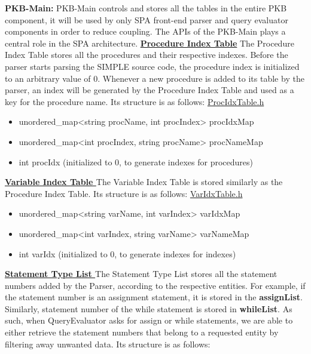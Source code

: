 \documentclass[12pt]{article}
\begin{document}
\textbf{PKB-Main:} PKB-Main controls and stores all the tables in the entire PKB component, it will be used by only SPA front-end parser and query evaluator components in order to reduce coupling. The APIs of the PKB-Main plays a central role in the SPA architecture. \textbf{\underline{Procedure Index Table}}
\newline The Procedure Index Table stores all the procedures and their respective indexes. Before the parser starts parsing the SIMPLE source code, the procedure index is initialized to an arbitrary value of 0. Whenever a new procedure is added to its table by the parser, an index will be generated by the Procedure Index Table and used as a key for the procedure name.
Its structure is as follows:\newline
\underline{ProcIdxTable.h
}
\begin{itemize}
\item unordered\_map<string procName, int procIndex> procIdxMap
\item unordered\_map<int procIndex, string procName> procNameMap
\item int procIdx (initialized to 0, to generate indexes for procedures)
\end{itemize}
\textbf{\underline{Variable Index Table
}}
\newline The Variable Index Table is stored similarly as the Procedure Index Table.
Its structure is as follows:
\newline
\underline{VarIdxTable.h}
\begin{itemize}
\item unordered\_map<string varName, int varIndex> varIdxMap
\item unordered\_map<int varIndex, string varName> varNameMap
\item int varIdx (initialized to 0, to generate indexes for indexes)
\end{itemize}
\textbf{\underline{Statement Type List
}}
\newline The Statement Type List stores all the statement numbers added by the Parser, according to the respective entities. For example, if the statement number is an assignment statement, it is stored in the \textbf{assignList}. Similarly, statement number of the while statement is stored in \textbf{whileList}.  As such, when QueryEvaluator asks for assign or while statements, we are able to either retrieve the statement numbers that belong to a requested entity by filtering away unwanted data.
\newline Its structure is as follows: \vspace{10mm}\newline
\end{document}
